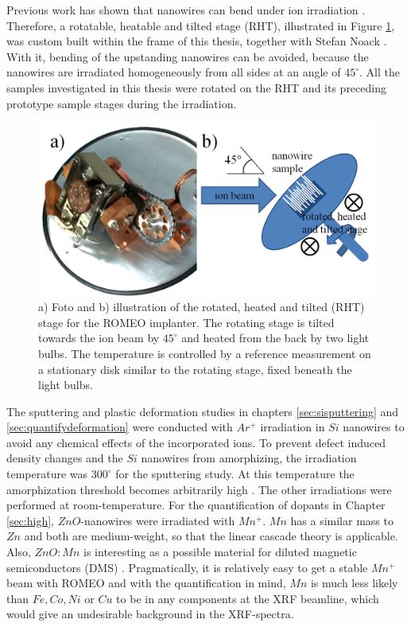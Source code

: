 Previous work has shown that nanowires can bend under ion irradiation \cite{borschel_permanent_2011, borschel_ion-solid_2012}. Therefore, a rotatable, heatable and tilted stage (RHT), illustrated in Figure \ref{RHT}, was custom built within the frame of this thesis, together with Stefan Noack \cite{noack_sputter_2014}. With it, bending of the upstanding nanowires can be avoided, because the nanowires are irradiated homogeneously from all sides at an angle of $45^\circ$. All the samples investigated in this thesis were rotated on the RHT and its preceding prototype sample stages during the irradiation. 

\begin{figure}[th]
	\centering
		\includegraphics[width=.8\textwidth]{images/RHTfotoscematic.png}
	\caption{a) Foto and b) illustration of the rotated, heated and tilted (RHT) stage for the ROMEO implanter. The rotating stage is tilted towards the ion beam by $45^\circ$ and heated from the back by two light bulbs. The temperature is controlled by a reference measurement on a stationary disk similar to the rotating stage, fixed beneath the light bulbs.}
	\label{RHT}
\end{figure} 

The sputtering and plastic deformation studies in chapters \ref{sec:sisputtering} and \ref{sec:quantifydeformation} were conducted with $Ar^+$ irradiation in $Si$ nanowires to avoid any chemical effects of the incorporated ions. To prevent defect induced density changes and the $Si$ nanowires from amorphizing, the irradiation temperature was $300^\circ$ for the sputtering study. At this temperature the amorphization threshold becomes arbitrarily high \cite{pelaz_ion-beam-induced_2004}. The other irradiations were performed at room-temperature. For the quantification of dopants in Chapter \ref{sec:high}, $ZnO$-nanowires were irradiated with $Mn^+$. $Mn$ has a similar mass to $Zn$ and both are medium-weight, so that the linear cascade theory is applicable. Also, $ZnO:Mn$ is interesting as a possible material for diluted magnetic semiconductors (DMS) \cite{furdyna_diluted_1988,norberg_synthesis_2004}. Pragmatically, it is relatively easy to get a stable $Mn^+$ beam with ROMEO and with the quantification in mind, $Mn$ is much less likely than $Fe, Co, Ni$ or $Cu$ to be in any components at the XRF beamline, which would give an undesirable background in the XRF-spectra.


